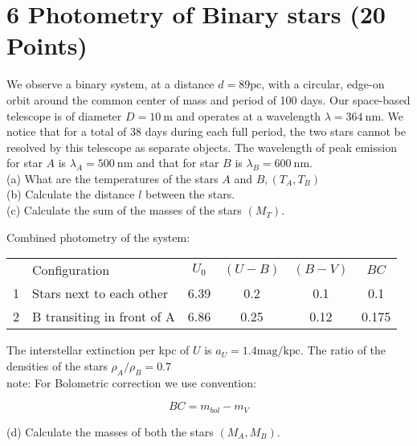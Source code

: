 \documentclass[10pt]{article}
\begin{document}
\section*{6 Photometry of Binary stars (20 Points)}
We observe a binary system, at a distance $d=89 \mathrm{pc}$, with a circular, edge-on orbit around the common center of mass and period of 100 days. Our space-based telescope is of diameter $D=10 \mathrm{~m}$ and operates at a wavelength $\lambda=364 \mathrm{~nm}$. We notice that for a total of 38 days during each full period, the two stars cannot be resolved by this telescope as separate objects. The wavelength of peak emission for star $A$ is $\lambda_{A}=500 \mathrm{~nm}$ and that for star $B$ is $\lambda_{B}=600 \mathrm{~nm}$.\\
(a) What are the temperatures of the stars $A$ and $B,\left(T_{A}, T_{B}\right)$\\
(b) Calculate the distance $l$ between the stars.\\
(c) Calculate the sum of the masses of the stars $\left(M_{T}\right)$.

Combined photometry of the system:

\begin{center}
\begin{tabular}{llcccc}
 & Configuration & $U_{0}$ & $(U-B)$ & $(B-V)$ & $B C$ \\
1 & Stars next to each other & 6.39 & 0.2 & 0.1 & 0.1 \\
2 & B transiting in front of A & 6.86 & 0.25 & 0.12 & 0.175 \\
\end{tabular}
\end{center}

The interstellar extinction per kpc of $U$ is $a_{U}=1.4 \mathrm{mag} / \mathrm{kpc}$. The ratio of the densities of the stars $\rho_{A} / \rho_{B}=0.7$\\
note: For Bolometric correction we use convention:

$$
B C=m_{b o l}-m_{V}
$$

(d) Calculate the masses of both the stars $\left(M_{A}, M_{B}\right)$.
\end{document}
